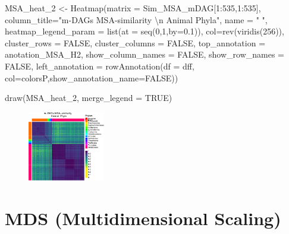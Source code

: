 \documentclass[
  letterpaper,
  DIV=11,
  numbers=noendperiod]{scrreprt}
\newenvironment{Shaded}{\begin{snugshade}}{\end{snugshade}}
\newcommand{\AttributeTok}[1]{\textcolor[rgb]{0.40,0.45,0.13}{#1}}
\newcommand{\ConstantTok}[1]{\textcolor[rgb]{0.56,0.35,0.01}{#1}}
\newcommand{\DecValTok}[1]{\textcolor[rgb]{0.68,0.00,0.00}{#1}}
\newcommand{\FloatTok}[1]{\textcolor[rgb]{0.68,0.00,0.00}{#1}}
\newcommand{\FunctionTok}[1]{\textcolor[rgb]{0.28,0.35,0.67}{#1}}
\newcommand{\NormalTok}[1]{\textcolor[rgb]{0.00,0.23,0.31}{#1}}
\newcommand{\OtherTok}[1]{\textcolor[rgb]{0.00,0.23,0.31}{#1}}
\newcommand{\SpecialCharTok}[1]{\textcolor[rgb]{0.37,0.37,0.37}{#1}}
\newcommand{\StringTok}[1]{\textcolor[rgb]{0.13,0.47,0.30}{#1}}
\begin{document}
\begin{Shaded}
\begin{Highlighting}[]
\NormalTok{MSA\_heat\_2 }\OtherTok{\textless{}{-}} \FunctionTok{Heatmap}\NormalTok{(}\AttributeTok{matrix =}\NormalTok{ Sim\_MSA\_mDAG[}\DecValTok{1}\SpecialCharTok{:}\DecValTok{535}\NormalTok{,}\DecValTok{1}\SpecialCharTok{:}\DecValTok{535}\NormalTok{], }
              \AttributeTok{column\_title=}\StringTok{"m{-}DAGs MSA{-}similarity }\SpecialCharTok{\textbackslash{}n}\StringTok{  Animal  Phyla"}\NormalTok{,}
            \AttributeTok{name =} \StringTok{" "}\NormalTok{, }
            \AttributeTok{heatmap\_legend\_param =} \FunctionTok{list}\NormalTok{(}\AttributeTok{at =} \FunctionTok{seq}\NormalTok{(}\DecValTok{0}\NormalTok{,}\DecValTok{1}\NormalTok{,}\AttributeTok{by=}\FloatTok{0.1}\NormalTok{)),}
        \AttributeTok{col=}\FunctionTok{rev}\NormalTok{(}\FunctionTok{viridis}\NormalTok{(}\DecValTok{256}\NormalTok{)),}
        \AttributeTok{cluster\_rows =} \ConstantTok{FALSE}\NormalTok{,}
        \AttributeTok{cluster\_columns =} \ConstantTok{FALSE}\NormalTok{,}
        \AttributeTok{top\_annotation =}\NormalTok{ anotation\_MSA\_H2,}
        \AttributeTok{show\_column\_names =} \ConstantTok{FALSE}\NormalTok{, }
        \AttributeTok{show\_row\_names =} \ConstantTok{FALSE}\NormalTok{,}
        \AttributeTok{left\_annotation =} \FunctionTok{rowAnnotation}\NormalTok{(}\AttributeTok{df =}\NormalTok{ dff,                                    }\AttributeTok{col=}\NormalTok{colorsP,}\AttributeTok{show\_annotation\_name=}\ConstantTok{FALSE}\NormalTok{))}
  
\FunctionTok{draw}\NormalTok{(MSA\_heat\_2, }\AttributeTok{merge\_legend =} \ConstantTok{TRUE}\NormalTok{)}
\end{Highlighting}
\end{Shaded}

\begin{figure}[H]

{\centering \includegraphics[width=0.3\textwidth,height=\textheight]{index_files/figure-pdf/unnamed-chunk-32-1.pdf}

}

\end{figure}

\hypertarget{mds-multidimensional-scaling}{%
\section*{MDS (Multidimensional
Scaling)}\label{mds-multidimensional-scaling}}
\end{document}
